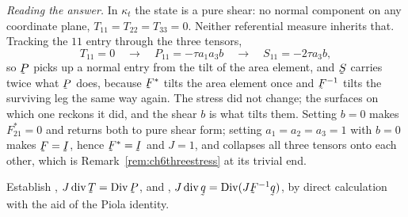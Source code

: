 \begin{solution}

\medskip
\noindent\emph{Reading the answer.}
In $\kappa_{t}$ the state is a pure shear: no normal component on any
coordinate plane, $T_{11}=T_{22}=T_{33}=0$. Neither referential measure
inherits that. Tracking the $11$ entry through the three tensors,
\[
   T_{11}=0
   \quad\longrightarrow\quad
   P_{11}=-\tau a_{1}a_{3}b
   \quad\longrightarrow\quad
   S_{11}=-2\tau a_{3}b ,
\]
so $\bP$ picks up a normal entry from the tilt of the area element, and
$\bS$ carries twice what $\bP$ does, because $\bF^{*}$ tilts the area
element once and $\bF^{-1}$ tilts the surviving leg the same way again.
The stress did not change; the surfaces on which one reckons it did,
and the shear $b$ is what tilts them. Setting $b=0$ makes
$F^{*}_{21}=0$ and returns both to pure shear form; setting
$a_{1}=a_{2}=a_{3}=1$ with $b=0$ makes $\bF=\I$, hence
$\bF^{*}=\I$ and $J=1$, and collapses all three tensors onto each
other, which is Remark~\ref{rem:ch6threestress} at its trivial end.
\end{solution}

\begin{problem}
Establish , $J\dvg\bT=\Dvg\bP$, and ,
$J\dvg\bq=\Dvg(J\bF^{-1}\bq)$, by direct calculation with the aid of the
Piola identity.
\end{problem}

